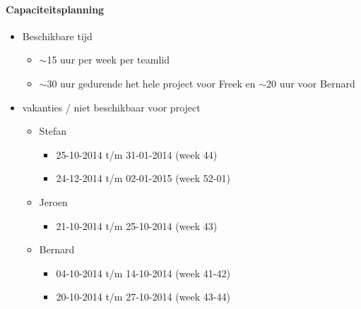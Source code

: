 \paragraph{Capaciteitsplanning}

\begin{itemize}
 \item Beschikbare tijd
 \begin{itemize}
  \item $\sim$15 uur per week per teamlid
  \item $\sim$30 uur gedurende het hele project voor Freek en $\sim$20 uur voor Bernard
 \end{itemize}



 \item vakanties / niet beschikbaar voor project
 \begin{itemize}

  \item Stefan
  \begin{itemize}
   \item 25-10-2014 t/m 31-01-2014 (week 44)
   \item 24-12-2014 t/m 02-01-2015 (week 52-01)
  \end{itemize}

  \item Jeroen
  \begin{itemize}
   \item 21-10-2014 t/m 25-10-2014 (week 43)
  \end{itemize}

  \item Bernard
   \begin{itemize}
    \item 04-10-2014 t/m 14-10-2014 (week 41-42)
    \item 20-10-2014 t/m 27-10-2014 (week 43-44)
   \end{itemize}

 \end{itemize}
\end{itemize}
